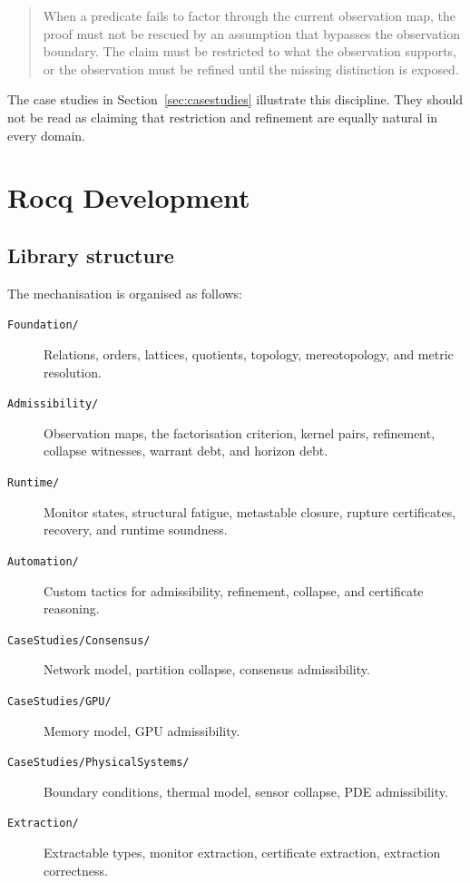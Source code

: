 \documentclass[a4paper,11pt]{article}
\begin{document}
\begin{quote}
When a predicate fails to factor through the current observation map, the proof
must not be rescued by an assumption that bypasses the observation boundary. The
claim must be restricted to what the observation supports, or the observation
must be refined until the missing distinction is exposed.
\end{quote}

The case studies in Section~\ref{sec:casestudies} illustrate this discipline.
They should not be read as claiming that restriction and refinement are equally
natural in every domain.

\section{Rocq Development}
\label{sec:rocq}

\subsection{Library structure}

The mechanisation is organised as follows:

\begin{description}
\item[\texttt{Foundation/}] Relations, orders, lattices, quotients, topology,
mereotopology, and metric resolution.
\item[\texttt{Admissibility/}] Observation maps, the factorisation criterion,
kernel pairs, refinement, collapse witnesses, warrant debt, and horizon debt.
\item[\texttt{Runtime/}] Monitor states, structural fatigue, metastable closure,
rupture certificates, recovery, and runtime soundness.
\item[\texttt{Automation/}] Custom tactics for admissibility, refinement,
collapse, and certificate reasoning.
\item[\texttt{CaseStudies/Consensus/}] Network model, partition collapse,
consensus admissibility.
\item[\texttt{CaseStudies/GPU/}] Memory model, GPU admissibility.
\item[\texttt{CaseStudies/PhysicalSystems/}] Boundary conditions, thermal model,
sensor collapse, PDE admissibility.
\item[\texttt{Extraction/}] Extractable types, monitor extraction, certificate
extraction, extraction correctness.
\end{description}
\end{document}
